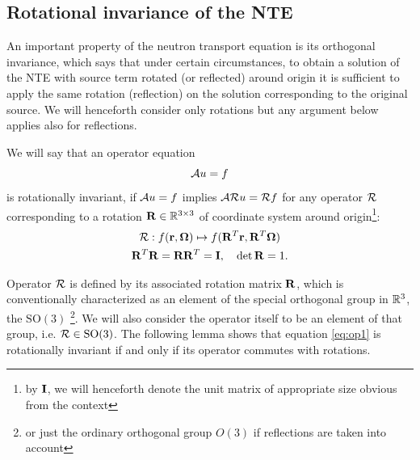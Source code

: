 \subsection{Rotational invariance of the NTE}\label{sec:rotinv}
An important property of the neutron transport equation is its orthogonal invariance, which says that under certain
circumstances, to obtain a solution of the NTE with source term rotated (or reflected) around origin it is sufficient to
apply the same rotation (reflection) on the solution corresponding to the original source. We will henceforth consider
only rotations but any argument below applies also for reflections.
 
\begin{definition}\label{def:rotinv}
We will say that an
operator equation
\begin{equation}\label{eq:op1} 
\genop{A}u = f
\end{equation}
is rotationally invariant, if $\genop{A}u = f$ implies $\genop{A}\genop{R}u = \genop{R}f$ for any operator
$\op{\genop{R}}$ corresponding to a rotation $\mat{R}\in\R[3\times3]$ of coordinate system around origin\footnote{by
$\mat{I}$, we will henceforth denote the unit matrix of appropriate size obvious from the context}:
\begin{equation}\label{eq:def_rot}
\begin{gathered}
\genop{R}: f(\br,\bomega) \mapsto f(\mat{R}^T\br,\mat{R}^T\bomega)\\
\mat{R}^T\mat{R} = \mat{R}\mat{R}^T = \mat{I},\quad \det \mat{R} = 1.
\end{gathered}
\end{equation}
%
\end{definition}
Operator $\genop{R}$ is defined by its associated rotation matrix $\mat{R}$, which is conventionally
characterized as an element of the special orthogonal group in $\R[3]$, the $\mathrm{SO}(3)$ \footnote{or just the
ordinary orthogonal group $O(3)$ if reflections are taken into account}.
We will also consider the operator itself to be an element of that group, i.e.
$\genop{R} \in \mathrm{SO}(3)$. The following lemma shows that equation \eqref{eq:op1} is rotationally invariant if and
only if its operator commutes with rotations.

